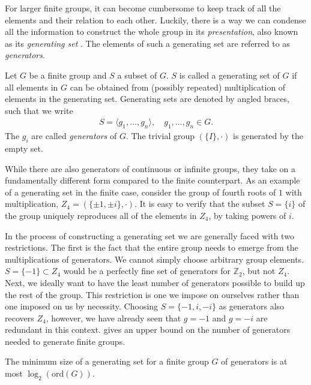 For larger finite groups, it can become cumbersome to keep track of all the
elements and their relation to each other. Luckily, there is a way we can
condense all the information to construct the whole group in its
\emph{presentation}, also known as its \emph{generating set}
\cite{zeeGroupTheoryNutshell2016}. The elements of
such a generating set are referred to as \emph{generators}.
\begin{defn}\label{defn:generators}
  Let $G$ be a finite group and $S$ a subset of $G$. $S$ is called a generating
  set of $G$ if all elements in $G$ can be obtained from (possibly repeated)
  multiplication of elements in the generating set. Generating sets are denoted
  by angled braces, such that we write
  \begin{align}
    S = \langle g_1, \ldots, g_n \rangle, \quad g_1,\ldots, g_n \in G
  .\end{align}
  The $g_i$ are called \emph{generators} of $G$. The trivial group $\left(
  \{I\}, \cdot \right)$ is generated by the empty set.
\end{defn}

While there are also generators of continuous or infinite groups, they take on a
fundamentally different form compared to the finite counterpart. As an
example of a generating set in the finite case, consider the group of fourth roots of $1$
with multiplication, $Z_4 = \left( \{\pm 1,\pm i\}, \cdot \right)$. It is easy
to verify that the subset $S = \{i\}$ of the group uniquely reproduces all of
the elements in $Z_4$, by taking powers of $i$.

In the process of constructing a generating set we are generally faced with two
restrictions. The first is the fact that the entire group needs to emerge from
the multiplications of generators. We cannot simply choose arbitrary group
elements. $S=\{-1\}\subset Z_4$ would be a perfectly fine set of generators for
$\mathbb{Z}_2$, but not $Z_4$. Next, we ideally want to have the least number
of generators possible to build up the rest of the group. This restriction is
one we impose on ourselves rather than one imposed on us by necessity. Choosing
$S=\{-1, i, -i\}$ as generators also recovers $Z_4$, however, we have already
seen that $g=-1$ and $g=-i$ are redundant in this context.
 gives an upper bound on the number of generators
needed to generate finite groups.

\begin{thm}\label{thm:maxsize-generators} 
  The minimum size of a generating set for a finite group $G$ of generators is
  at most $\log_2(\mathrm{ord}(G))$.
\end{thm}

